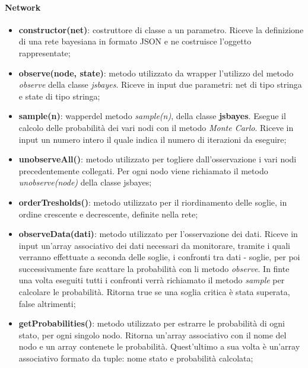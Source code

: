 \paragraph{Network}
\begin{itemize}

	\item \textbf{constructor(net)}: costruttore di classe a un parametro. Riceve la definizione di una rete 
	bayesiana in formato JSON e ne costruisce l'oggetto rappresentate; 

	\item \textbf{observe(node, state)}: metodo utilizzato da wrap\glossario per l'utilizzo del metodo 
	\textit{observe} della classe \textit{jsbayes}. Riceve in input due parametri: net	di tipo stringa e state di 
	tipo stringa; 

	\item \textbf{sample(n)}: wapper\glossario del metodo \textit{sample(n)}, della classe \textbf{jsbayes}. 
	Esegue il calcolo delle probabilità dei vari nodi con il metodo \textit{Monte Carlo}. Riceve in input un 
	numero intero il quale indica il numero di iterazioni da eseguire; 
	
	\item \textbf{unobserveAll()}: metodo utilizzato per togliere dall'osservazione i vari nodi precedentemente 
	collegati. Per ogni nodo viene richiamato il metodo \textit{unobserve(node)} della classe jsbayes; 
	
	\item \textbf{orderTresholds()}: metodo utilizzato per il riordinamento delle soglie, in ordine crescente e 
	decrescente, definite nella rete; 
	
	\item \textbf{observeData(dati)}: metodo utilizzato per l'osservazione dei dati. Riceve in input un'array 
	associativo dei dati necessari da monitorare, tramite i quali verranno effettuate a seconda delle 
	soglie, i confronti tra dati - soglie, per poi successivamente fare scattare la probabilità con li metodo 
	\textit{observe}. In finte una volta eseguiti tutti i confronti verrà richiamato il metodo \textit{sample} per 
	calcolare le probabilità. Ritorna true se una soglia critica è stata superata, false altrimenti; 
	
	\item \textbf{getProbabilities()}: metodo utilizzato per estrarre le probabilità di ogni stato, per ogni 
	singolo nodo. Ritorna un'array associativo con il nome del nodo e un array contenete le probabilità. 
	Quest'ultimo a sua volta è un'array associativo formato da tuple: nome stato e probabilità calcolata; 
			
\end{itemize}

